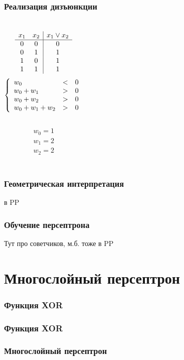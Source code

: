 \documentclass[24pt,pdf,hyperref={unicode}]{beamer}
\begin{document}
\begin{frame}\frametitle{Реализация дизъюнкции}
\begin{columns}
$$
\begin{array}{c c | c}
x_1 & x_2 & x_1\vee x_2 \\
\hline
0 & 0 & 0 \\
0 & 1 & 1 \\
1 & 0 & 1 \\
1 & 1 & 1 \\
\end{array}
$$
$$
\left\{
\begin{array}{l l l l l l}
 w_0       & < & 0 \\
 w_0 + w_1 & > & 0 \\
 w_0 + w_2 & > & 0 \\
 w_0 + w_1 + w_2 & > & 0 \\
\end{array}
\right.
$$\\[1cm]
$$
\begin{array}{l}
 w_0 = 1 \\
 w_1 = 2 \\
 w_2 = 2 \\
\end{array}
$$
\end{columns}
\end{frame}

\begin{frame}\frametitle{Геометрическая интерпретация}
в PP
\end{frame}

\begin{frame}\frametitle{Обучение персептрона}
Тут про советчиков, м.б. тоже в PP
\end{frame}




\section{Многослойный персептрон}

\begin{frametitle}\frametitle{Функция XOR}
 
\end{frametitle}

\begin{frametitle}\frametitle{Функция XOR}
 
\end{frametitle}

\begin{frametitle}\frametitle{Многослойный персептрон}
 
\end{frametitle}
\end{document}
